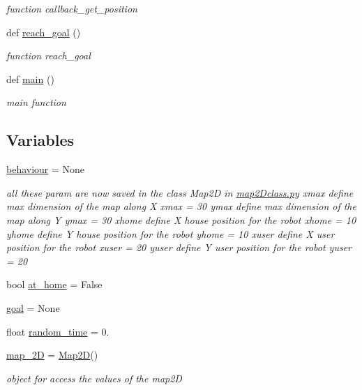 \begin{DoxyCompactItemize}
\begin{DoxyCompactList}\small\item\em function callback\+\_\+get\+\_\+position \end{DoxyCompactList}\item 
def \hyperlink{namespacemotion_a58accc2356096af3ae30fe9442a1a482}{reach\+\_\+goal} ()
\begin{DoxyCompactList}\small\item\em function reach\+\_\+goal \end{DoxyCompactList}\item 
def \hyperlink{namespacemotion_ad6289fca8572f5af95fd28f4c2dbc68d}{main} ()
\begin{DoxyCompactList}\small\item\em main function \end{DoxyCompactList}\end{DoxyCompactItemize}
\subsection*{Variables}
\begin{DoxyCompactItemize}
\item 
\hyperlink{namespacemotion_a15d63b2a70ac940f179085ce72871c86}{behaviour} = None
\begin{DoxyCompactList}\small\item\em all these param are now saved in the class Map2D in \hyperlink{map2Dclass_8py}{map2\+Dclass.\+py} xmax define max dimension of the map along X xmax = 30 ymax define max dimension of the map along Y ymax = 30 xhome define X house position for the robot xhome = 10 yhome define Y house position for the robot yhome = 10 xuser define X user position for the robot xuser = 20 yuser define Y user position for the robot yuser = 20 \end{DoxyCompactList}\item 
bool \hyperlink{namespacemotion_a30e58643e988d1faddb84cdfd54965f8}{at\+\_\+home} = False
\item 
\hyperlink{namespacemotion_a6427953689c120f9b8a1cb3646733b85}{goal} = None
\item 
float \hyperlink{namespacemotion_a577a5f71c1bdf849f48eed17c4134bee}{random\+\_\+time} = 0.
\item 
\hyperlink{namespacemotion_a858c2a633daaa0a83b599397041f524b}{map\+\_\+2D} = \hyperlink{classmap2Dclass_1_1Map2D}{Map2D}()
\begin{DoxyCompactList}\small\item\em object for access the values of the map2D \end{DoxyCompactList}\end{DoxyCompactItemize}


